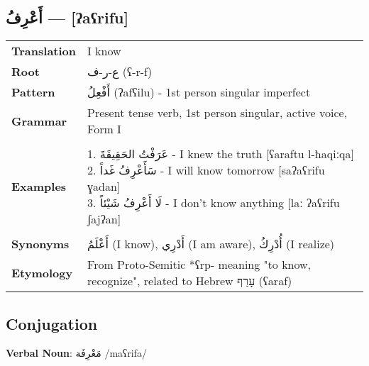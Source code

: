 \documentclass[letterpaper,12pt]{article}
\begin{document}
\subsection{\textarabic{أَعْرِفُ} — [ʔaʕrifu]}

\begin{tabular}{p{3cm}p{10cm}}
\toprule
\textbf{Translation} & I know \\
\textbf{Root} & \textarabic{ع-ر-ف} (ʕ-r-f) \\
\textbf{Pattern} & \textarabic{أَفْعِلُ} (ʔafʕilu) - 1st person singular imperfect \\
\textbf{Grammar} & Present tense verb, 1st person singular, active voice, Form I \\
\midrule \\
\textbf{Examples} & \makecell[l]{\parbox{9.5cm}{
1. \textarabic{عَرَفْتُ الحَقِيقَةَ} - I knew the truth [ʕaraftu l-ħaqiːqa]\\
2. \textarabic{سَأَعْرِفُ غَداً} - I will know tomorrow [saʔaʕrifu ɣadan]\\
3. \textarabic{لَا أَعْرِفُ شَيْئاً} - I don't know anything [laː ʔaʕrifu ʃajʔan]
}} \\
\midrule \\
\textbf{Synonyms} & \textarabic{أَعْلَمُ} (I know), \textarabic{أَدْرِي} (I am aware), \textarabic{أُدْرِكُ} (I realize) \\
\textbf{Etymology} & From Proto-Semitic *ʕrp- meaning "to know, recognize", related to Hebrew \texthebrew{עָרַף} (ʕaraf) \\
\bottomrule
\end{tabular}

\subsection{Conjugation}
\par{ \large \textbf{Verbal Noun}: \textarabic{مَعْرِفَة} /maʕrifa/}
\end{document}
